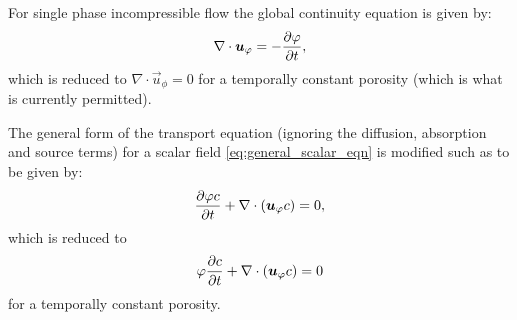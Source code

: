 For single phase incompressible flow the global continuity equation is given by:
\begin{equation} 
   \label{eq:cty_single_phase_darcy}
   \nabla\cdot {\mbox{\boldmath$u$}}_{\varphi} = - \frac{\partial\varphi}{\partial t},
\end{equation}
which is reduced to $\nabla\cdot \vec{u}_{\phi} = 0$ for a temporally constant porosity (which is what is currently permitted).

The general form of the transport equation (ignoring the diffusion, absorption and source terms) for a scalar field \eqref{eq:general_scalar_eqn} is modified such as to be given by:
\begin{equation}
   \label{eq:general_scalar_eqn_single_phase_darcy}
   \frac{\partial\varphi c}{\partial t} + \nabla\cdot({\mbox{\boldmath$u$}}_{\varphi} c) = 0,
\end{equation}
which is reduced to
\begin{equation}
   \varphi \frac{\partial c}{\partial t} + \nabla\cdot({\mbox{\boldmath$u$}}_{\varphi} c) = 0
\end{equation}
for a temporally constant porosity.
